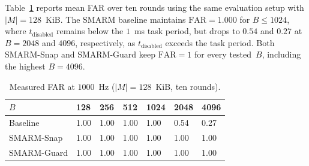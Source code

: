 \documentclass[conference]{IEEEtran}
\newcommand{\tdis}{$t_{\mathrm{disabled}}$\xspace}
\newcommand{\smarmcopy}{SMARM-Snap\xspace}
\newcommand{\smarmlock}{SMARM-Guard\xspace}
\begin{document}
Table~\ref{tab:far} reports mean FAR over ten rounds
using the same evaluation setup with $|M|{=}128$~KiB. The SMARM
baseline maintains $\mathrm{FAR}=1.000$ for $B\leq1024$, where
\tdis{} remains below the $1$~ms task period, but drops to $0.54$
and $0.27$ at $B{=}2048$ and $4096$, respectively, as \tdis{}
exceeds the task period. Both \smarmcopy{} and \smarmlock{} keep
$\mathrm{FAR}=1$ for every tested~$B$, including the highest $B=4096$.

\begin{table}[ht]
  \centering
  \caption{Measured FAR at $1000$~Hz ($|M|{=}128$~KiB, ten rounds).}
  \label{tab:far}
  \small
  \setlength{\tabcolsep}{3.5pt}
  \begin{tabularx}{\columnwidth}{@{}lXXXXXX@{}}
    \toprule
    \textbf{$B$} & 128 & 256 & 512 & 1024 & 2048 & 4096 \\
    \midrule
    Baseline & 1.00 & 1.00 & 1.00 & 1.00 & 0.54 & 0.27 \\
    \smarmcopy & 1.00 & 1.00 & 1.00 & 1.00 & 1.00 & 1.00 \\
    \smarmlock & 1.00 & 1.00 & 1.00 & 1.00 & 1.00 & 1.00 \\
    \bottomrule
  \end{tabularx}
\end{table}




\end{document}
